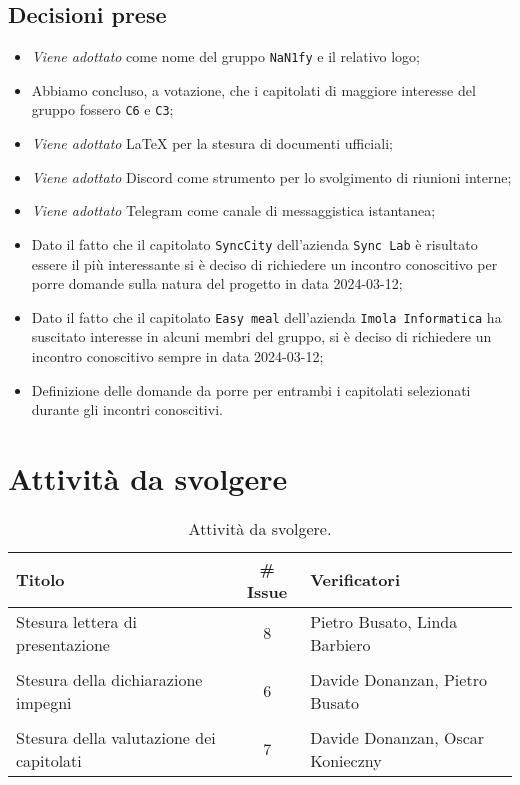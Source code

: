 \subsection{Decisioni prese}
\begin{itemize}
	\setlength\itemsep{0em}
	\item \textit{Viene adottato} come nome del gruppo \texttt{NaN1fy} e il relativo logo;
	\item Abbiamo concluso, a votazione, che i capitolati di maggiore interesse del gruppo fossero \texttt{C6} e \texttt{C3};
	\item \textit{Viene adottato} \LaTeX\: per la stesura di documenti ufficiali;
	\item \textit{Viene adottato} Discord come strumento per lo svolgimento di riunioni interne;
	\item \textit{Viene adottato} Telegram come canale di messaggistica istantanea;
	\item Dato il fatto che il capitolato \texttt{SyncCity} dell’azienda \texttt{Sync Lab} è risultato essere il più interessante si è deciso di richiedere un incontro conoscitivo per porre domande sulla natura del progetto in data 2024-03-12;
	\item Dato il fatto che il capitolato \texttt{Easy meal} dell’azienda \texttt{Imola Informatica} ha suscitato interesse in alcuni membri del gruppo, si è deciso di richiedere un incontro conoscitivo sempre in data 2024-03-12;
	\item Definizione delle domande da porre per entrambi i capitolati selezionati durante gli incontri conoscitivi.
\end{itemize}
\section{Attività da svolgere}
\begin{table}[ht!]
	\centering
	\begin{tabular}{lcl}
		\toprule
		\textbf{Titolo} & \textbf{\# Issue} & \textbf{Verificatori} \\
		\midrule
		Stesura lettera di presentazione & 8 & Pietro Busato, Linda Barbiero\\\\
		Stesura della dichiarazione impegni  &  6 & Davide Donanzan, Pietro Busato \\\\
		Stesura della valutazione dei capitolati & 7 & Davide Donanzan, Oscar Konieczny \\
		\bottomrule
	\end{tabular}
	\caption{Attività da svolgere.}
	\label{table:Attivita da svolgere}
\end{table}


